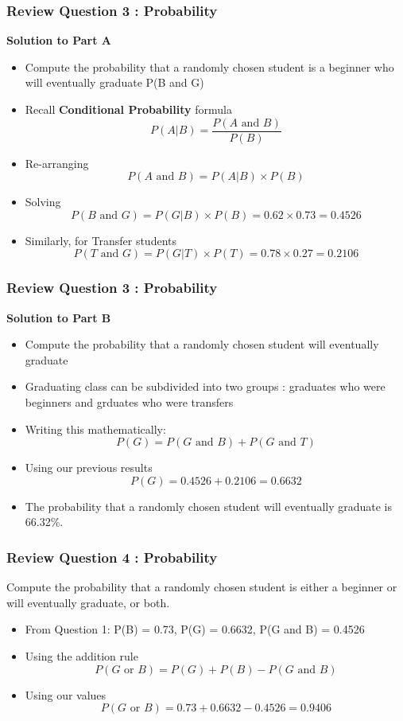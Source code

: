 \begin{frame}
\frametitle{Review Question 3 :  Probability}
\textbf{Solution to Part A}
\begin{itemize}
\item Compute the probability that a randomly chosen student is a beginner who will
eventually graduate P(B and G)
\item Recall \textbf{Conditional Probability} formula
\[P(A|B) = \frac{P(A \mbox{ and } B)}{P(B)}\]
\item Re-arranging
\[P(A \mbox{ and } B) = P(A|B)\times P(B)  \]
\item Solving
\[P(B \mbox{ and } G) = P(G|B)\times P(B) = 0.62 \times 0.73  = 0.4526 \]
\item Similarly, for Transfer students
\[P(T \mbox{ and } G) = P(G|T)\times P(T) = 0.78 \times 0.27  = 0.2106 \]
\end{itemize}
\end{frame}
\begin{frame}
\frametitle{Review Question 3 :  Probability}
\textbf{Solution to Part B}
\begin{itemize}
\item Compute the probability that a randomly chosen student will eventually graduate
\item Graduating class can be subdivided into two groups : graduates who were beginners and grduates who were transfers
\item Writing this mathematically:
\[P(G) = P(G \mbox{ and } B) + P(G \mbox{ and } T) \]
\item Using our previous results
\[P(G) = 0.4526 + 0.2106 = 0.6632 \]
\item The probability that a randomly chosen student will eventually graduate is 66.32\%.
\end{itemize}
\end{frame}
\begin{frame}
\frametitle{Review Question 4 :  Probability}
Compute the probability that a randomly chosen student is either a beginner or will
eventually graduate, or both.
\begin{itemize}
\item From Question 1: P(B) = 0.73, P(G) = 0.6632, P(G and B) = 0.4526
\item Using the addition rule
\[P(G \mbox{ or } B) = P(G) + P(B) - P(G \mbox{ and } B)\]
\item Using our values
\[P(G \mbox{ or } B) = 0.73 + 0.6632 - 0.4526 = 0.9406\]
\end{itemize}
\end{frame}

